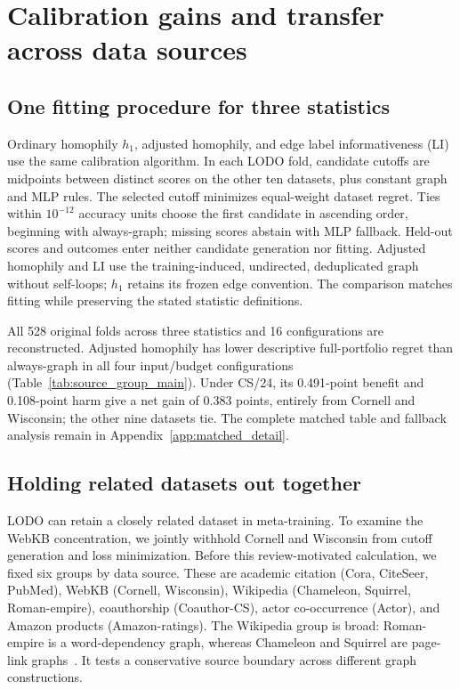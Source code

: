 \section{Calibration gains and transfer across data sources}
\label{sec:matched_audit}

\subsection{One fitting procedure for three statistics}

Ordinary homophily $h_1$, adjusted homophily, and edge label informativeness (LI) use the same calibration algorithm. In each LODO fold, candidate cutoffs are midpoints between distinct scores on the other ten datasets, plus constant graph and MLP rules. The selected cutoff minimizes equal-weight dataset regret. Ties within $10^{-12}$ accuracy units choose the first candidate in ascending order, beginning with always-graph; missing scores abstain with MLP fallback. Held-out scores and outcomes enter neither candidate generation nor fitting. Adjusted homophily and LI use the training-induced, undirected, deduplicated graph without self-loops; $h_1$ retains its frozen edge convention. The comparison matches fitting while preserving the stated statistic definitions.

All 528 original folds across three statistics and 16 configurations are reconstructed. Adjusted homophily has lower descriptive full-portfolio regret than always-graph in all four input/budget configurations (Table~\ref{tab:source_group_main}). Under CS/24, its 0.491-point benefit and 0.108-point harm give a net gain of 0.383 points, entirely from Cornell and Wisconsin; the other nine datasets tie. The complete matched table and fallback analysis remain in Appendix~\ref{app:matched_detail}.

\subsection{Holding related datasets out together}

LODO can retain a closely related dataset in meta-training. To examine the WebKB concentration, we jointly withhold Cornell and Wisconsin from cutoff generation and loss minimization. Before this review-motivated calculation, we fixed six groups by data source. These are academic citation (Cora, CiteSeer, PubMed), WebKB (Cornell, Wisconsin), Wikipedia (Chameleon, Squirrel, Roman-empire), coauthorship (Coauthor-CS), actor co-occurrence (Actor), and Amazon products (Amazon-ratings). The Wikipedia group is broad: Roman-empire is a word-dependency graph, whereas Chameleon and Squirrel are page-link graphs~\citep{platonov2023heterophilous,pei2020geomgcn}. It tests a conservative source boundary across different graph constructions.

